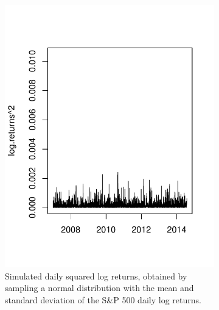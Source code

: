 \begin{figure}[htbp]
\begin{subfigure}[t]{0.4\textwidth}
                \includegraphics[width=\textwidth]{./chapter-1-introduction/SP500-daily-squared-log-returns-constant-vol.pdf}
                \caption{Simulated daily squared log returns, obtained by sampling a normal distribution with the mean and standard deviation of the S\&P 500 daily log returns. }
                \label{fig:sp500-returns-constant-vol}
        \end{subfigure}
	\\
	\begin{subfigure}[t]{0.4\textwidth}

\end{subfigure}
\end{figure}
